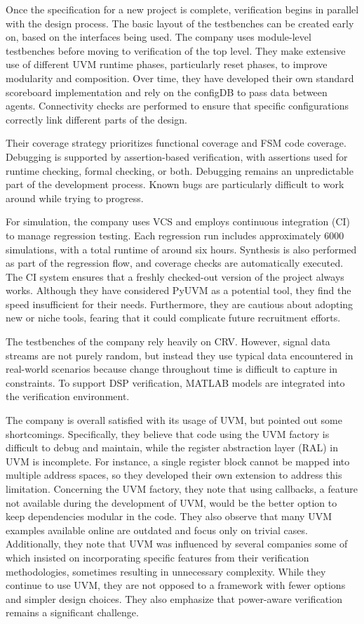 Once the specification for a new project is complete, verification begins in parallel with the design process. The
basic layout of the testbenches can be created early on, based on the interfaces being used. The company uses
module-level testbenches before moving to verification of the top level. They make extensive use of different UVM
runtime phases, particularly reset phases, to improve modularity and composition. Over time, they have developed
their own standard scoreboard implementation and rely on the configDB to pass data between agents. Connectivity
checks are performed to ensure that specific configurations correctly link different parts of the design.

Their coverage strategy prioritizes functional coverage and FSM code coverage. Debugging is supported by
assertion-based verification, with assertions used for runtime checking, formal checking, or both. Debugging remains
an unpredictable part of the development process. Known bugs are particularly difficult to work around while trying to progress.

For simulation, the company uses VCS and employs continuous integration (CI) to manage regression testing. Each
regression run includes approximately 6000 simulations, with a total runtime of around six hours. Synthesis is also
performed as part of the regression flow, and coverage checks are automatically executed. The CI system ensures that
a freshly checked-out version of the project always works. Although they have considered PyUVM as a potential tool,
they find the speed insufficient for their needs. Furthermore, they are cautious about adopting new or niche tools,
fearing that it could complicate future recruitment efforts.

The testbenches of the company rely heavily on CRV. However, signal data streams are not purely random, but instead
they use typical data encountered in real-world scenarios because change throughout time is difficult to capture in
constraints. To support DSP verification, MATLAB models are integrated into the verification environment.

The company is overall satisfied with its usage of UVM, but pointed out some shortcomings. Specifically, they
believe that code using the UVM factory is difficult to debug and maintain, while the register abstraction layer
(RAL) in UVM is incomplete. For instance, a single register block cannot be mapped into multiple address spaces, so
they developed their own extension to address this limitation. Concerning the UVM factory, they note that using
callbacks, a feature not available during the development of UVM, would be the better option to keep dependencies
modular in the code. They also observe that many UVM examples available online are outdated and focus only on trivial
cases. Additionally, they note that UVM was influenced by several companies some of which insisted on incorporating specific
features from their verification methodologies, sometimes resulting in unnecessary complexity. While they
continue to use UVM, they are not opposed to a framework with fewer options and simpler design choices. They
also emphasize that power-aware verification remains a significant challenge.

